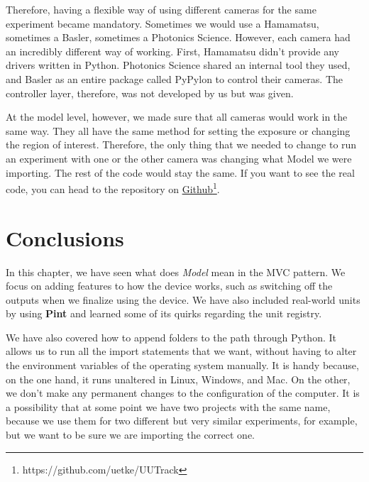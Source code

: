 Therefore, having a flexible way of using different cameras for the same experiment became mandatory. Sometimes we would use a Hamamatsu, sometimes a Basler, sometimes a Photonics Science. However, each camera had an incredibly different way of working. First, Hamamatsu didn't provide any drivers written in Python. Photonics Science shared an internal tool they used, and Basler as an entire package called PyPylon to control their cameras. The controller layer, therefore, was not developed by us but was given.

At the model level, however, we made sure that all cameras would work in the same way. They all have the same method for setting the exposure or changing the region of interest. Therefore, the only thing that we needed to change to run an experiment with one or the other camera was changing what Model we were importing. The rest of the code would stay the same. If you want to see the real code, you can head to the repository on \href{https://github.com/uetke/UUTrack/tree/master/UUTrack/Model/Cameras}{Github}\footnote{https://github.com/uetke/UUTrack}.

\section{Conclusions}\label{conclusions}
In this chapter, we have seen what does \emph{Model} mean in the {MVC} pattern. We focus on adding features to how the device works, such as switching off the outputs when we finalize using the device. We have also included real-world units by using \textbf{Pint} and learned some of its quirks regarding the unit registry.

We have also covered how to append folders to the path through Python. It allows us to run all the import statements that we want, without having to alter the environment variables of the operating system manually. It is handy because, on the one hand, it runs unaltered in Linux, Windows, and Mac. On the other, we don't make any permanent changes to the configuration of the computer. It is a possibility that at some point we have two projects with the same name, because we use them for two different but very similar experiments, for example, but we want to be sure we are importing the correct one.
